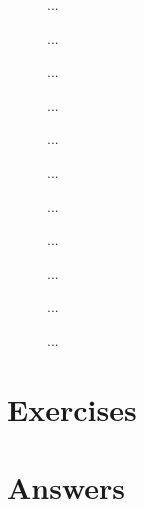 \begin{description}
\item[]{...}
\item[]{...}
\item[]{...}
\item[]{...}
\item[]{...}
\item[]{...}
\item[]{...}
\item[]{...}
\item[]{...}
\item[]{...}
\item[]{...}
\end{description}

\section{Exercises}




\cleardoublepage
\section{Answers}
\shipoutAnswer
